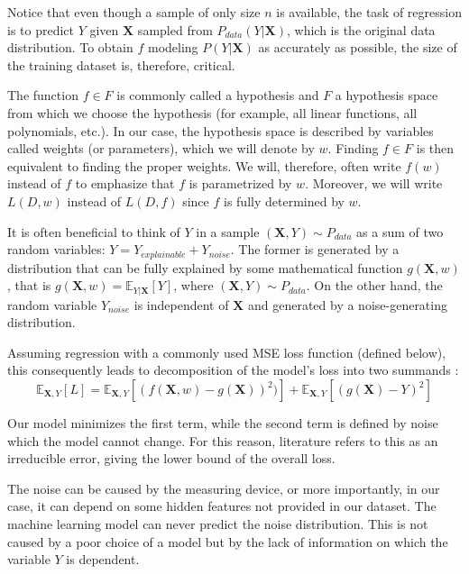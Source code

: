 Notice that even though a sample of only size $n$ is available, the task of regression is to predict $Y$ given $\textbf{X}$ sampled from $P_{data}(Y|\textbf{X})$, which is the original data distribution. To obtain $f$ modeling $P(Y|\textbf{X})$ as accurately as possible, the size of the training dataset is, therefore, critical.

\begin{defn}\label{def01:4}
The function $f \in F$ is commonly called a hypothesis and $F$ a hypothesis space from which we choose the hypothesis (for example, all linear functions, all polynomials, etc.). In our case, the hypothesis space is described by variables called weights (or parameters), which we will denote by $w$. Finding $f \in F$ is then equivalent to finding the proper weights. We will, therefore, often write $f(w)$ instead of $f$ to emphasize that $f$ is parametrized by $w$. Moreover, we will write $L(D, w)$ instead of $L(D, f)$ since $f$ is fully determined by $w$.
\end{defn}

It is often beneficial to think of $Y$ in a sample $(\textbf{X}, Y) \sim P_{data}$ as a sum of two random variables: $Y = Y_{explainable} + Y_{noise}$. The former is generated by a distribution that can be fully explained by some mathematical function $g(\textbf{X}, w)$, that is $g(\textbf{X}, w) = \mathbb{E}_{Y|\textbf{X}}[Y]$, where $(\textbf{X}, Y) \sim P_{data}$. On the other hand, the random variable $Y_{noise}$ is independent of $\textbf{X}$ and generated by a noise-generating distribution. 

Assuming regression with a commonly used MSE loss function (defined below), this consequently leads to decomposition of the model’s loss into two summands \citep{bishop2006pattern}:
\begin{equation}
\mathbb{E}_{\textbf{X}, Y}[L] = 
\mathbb{E}_{\textbf{X}, Y}[(f(\textbf{X}, w) - g(\textbf{X}))^2)] + 
\mathbb{E}_{\textbf{X}, Y}[(g(\textbf{X}) - Y)^2]
\end{equation}

Our model minimizes the first term, while the second term is defined by noise which the model cannot change. For this reason, literature refers to this as an irreducible error, giving the lower bound of the overall loss.

The noise can be caused by the measuring device, or more importantly, in our case, it can depend on some hidden features not provided in our dataset. The machine learning model can never predict the noise distribution. This is not caused by a poor choice of a model but by the lack of information on which the variable $Y$ is dependent.

